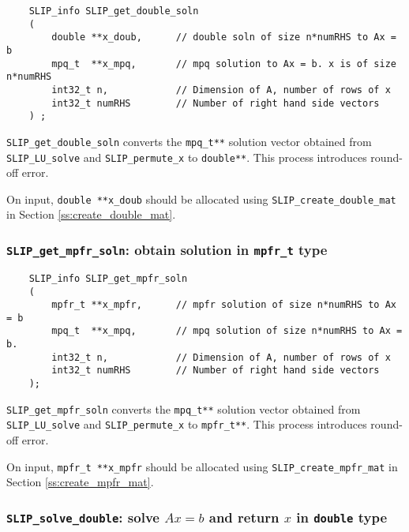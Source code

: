 \documentclass[12pt]{article}
\theoremstyle{definition}
\begin{document}
\begin{mdframed}[userdefinedwidth=6in]
{\footnotesize
\begin{verbatim}
    SLIP_info SLIP_get_double_soln
    (
        double **x_doub,      // double soln of size n*numRHS to Ax = b
        mpq_t  **x_mpq,       // mpq solution to Ax = b. x is of size n*numRHS
        int32_t n,            // Dimension of A, number of rows of x
        int32_t numRHS        // Number of right hand side vectors
    ) ;
\end{verbatim}
} \end{mdframed}

\verb|SLIP_get_double_soln| converts the \verb|mpq_t**| solution vector
obtained from \verb|SLIP_LU_solve| and \verb|SLIP_permute_x| to
\verb|double**|. This process introduces round-off error.

On input, \verb|double **x_doub| should be allocated using
\verb|SLIP_create_double_mat| in Section \ref{ss:create_double_mat}.

\cprotect\subsubsection{\verb|SLIP_get_mpfr_soln|: obtain solution in \verb|mpfr_t| type}
\label{ss:get_mpfr_soln}

\begin{mdframed}[userdefinedwidth=6in]
{\footnotesize
\begin{verbatim}
    SLIP_info SLIP_get_mpfr_soln
    (
        mpfr_t **x_mpfr,      // mpfr solution of size n*numRHS to Ax = b
        mpq_t  **x_mpq,       // mpq solution of size n*numRHS to Ax = b.
        int32_t n,            // Dimension of A, number of rows of x
        int32_t numRHS        // Number of right hand side vectors
    );
\end{verbatim}
} \end{mdframed}

\verb|SLIP_get_mpfr_soln| converts the \verb|mpq_t**| solution vector obtained
from \verb|SLIP_LU_solve| and \verb|SLIP_permute_x| to \verb|mpfr_t**|. This
process introduces round-off error.

On input, \verb|mpfr_t **x_mpfr| should be allocated using
\verb|SLIP_create_mpfr_mat| in Section \ref{ss:create_mpfr_mat}.

\cprotect\subsubsection{\verb|SLIP_solve_double|: solve $Ax=b$ and return $x$ in \verb|double| type}
\label{ss:SLIP_solve_double}
\end{document}
